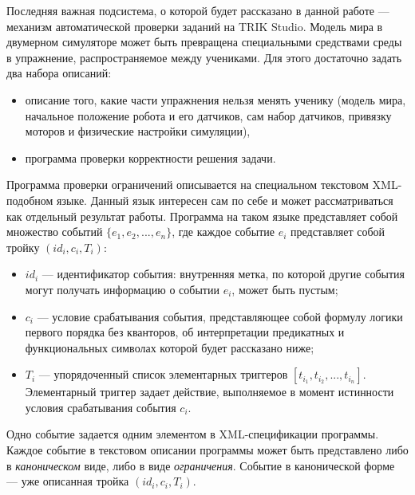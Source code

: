 \documentclass[conference]{IEEEtran}
\begin{document}
Последняя важная подсистема, о которой будет рассказано в данной работе --- механизм автоматической проверки заданий на TRIK Studio. Модель мира в двумерном симуляторе может быть превращена специальными средствами среды в упражнение, распространяемое между учениками. Для этого достаточно задать два набора описаний:

\begin{itemize}
    \item описание того, какие части упражнения нельзя менять ученику (модель мира, начальное положение робота и его датчиков, сам набор датчиков, привязку моторов и физические настройки симуляции),
    \item программа проверки корректности решения задачи.
\end{itemize}

Программа проверки ограничений описывается на специальном текстовом XML-подобном языке. Данный язык интересен сам по себе и может рассматриваться как отдельный результат работы. Программа на таком языке представляет собой множество событий $\{ e_1, e_2, ..., e_n \}$, где каждое событие 
$e_i$ представляет собой тройку $(id_i, c_i, T_i)$:

\begin{itemize}
    \item $id_i$ --- идентификатор события: внутренняя метка, по которой другие события могут получать информацию о событии $e_i$, может быть пустым;
    \item $c_i$ --- условие срабатывания события, представляющее собой формулу логики первого порядка без кванторов, об интерпретации предикатных и функциональных символах которой будет рассказано ниже;
    \item $T_i$ --- упорядоченный список элементарных триггеров $[ t_{i_1}, t_{i_2}, ..., t_{i_n} ]$. Элементарный триггер задает действие, выполняемое в момент истинности условия срабатывания события $c_i$.
\end{itemize}

Одно событие задается одним элементом в XML-спецификации программы. Каждое событие в текстовом описании 
программы может быть представлено либо в \textit{каноническом} виде, либо в виде \textit{ограничения}. Событие в канонической форме --- уже описанная тройка $(id_i, c_i, T_i)$.
\end{document}

